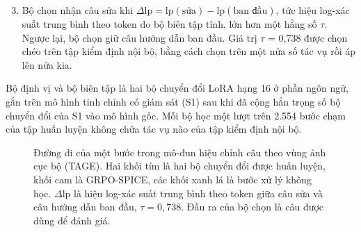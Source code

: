 \begin{enumerate}
\setcounter{enumi}{2}
\item Bộ chọn nhận câu sửa khi $\Delta\mathrm{lp} = \mathrm{lp}(\text{sửa}) - \mathrm{lp}(\text{ban đầu})$, tức hiệu log-xác suất trung bình theo token do bộ biên tập tính, lớn hơn một hằng số $\tau$. Ngược lại, bộ chọn giữ câu hướng dẫn ban đầu. Giá trị $\tau$ = 0,738 được chọn chéo trên tập kiểm định nội bộ, bằng cách chọn trên một nửa số tác vụ rồi áp lên nửa kia.
\end{enumerate}

Bộ định vị và bộ biên tập là hai bộ chuyển đổi LoRA hạng 16 ở phần ngôn ngữ, gắn trên mô hình tinh chỉnh có giám sát (S1) sau khi đã cộng hẳn trọng số bộ chuyển đổi của S1 vào mô hình gốc. Mỗi bộ học một lượt trên 2.554 bước chạm của tập huấn luyện không chứa tác vụ nào của tập kiểm định nội bộ.

\begin{figure}[!htbp]
\centering
{}
\caption[Đường đi của một bước trong mô-đun hiệu chỉnh câu theo vùng ảnh cục bộ (TAGE).]{Đường đi của một bước trong mô-đun hiệu chỉnh câu theo vùng ảnh cục bộ (TAGE). Hai khối tím là hai bộ chuyển đổi được huấn luyện, khối cam là GRPO-SPICE, các khối xanh lá là bước xử lý không học. $\Delta\mathrm{lp}$ là hiệu log-xác suất trung bình theo token giữa câu sửa và câu hướng dẫn ban đầu, $\tau = 0{,}738$. Đầu ra của bộ chọn là câu được dùng để đánh giá.}
\label{fig:A.1}
\end{figure}

